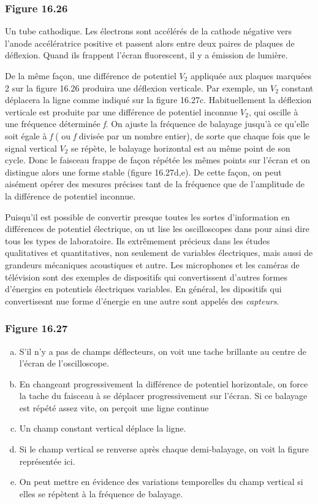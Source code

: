 \documentclass[../main.tex]{subfiles}
\begin{document}
\subsubsection*{Figure 16.26}
Un tube cathodique. Les électrons sont accélérés de la cathode négative vers l'anode accélératrice positive et passent alors entre deux paires de plaques de déflexion. Quand ils frappent l'écran fluorescent, il y a émission de lumière.\\
\par De la même façon, une différence de potentiel $V_2$ appliquée aux plaques marquées 2 sur la figure 16.26 produira une déflexion verticale. Par exemple, un $V_2$ constant déplacera la ligne comme indiqué sur la figure 16.27c. Habituellement la déflexion verticale est produite par une différence de potentiel inconnue $V_2$, qui oscille à une fréquence déterminée \textit{f}. On ajuste la fréquence de balayage jusqu'à ce qu'elle soit égale à \textit{f} ( ou \textit{f} divisée par un nombre entier), de sorte que chaque fois que le signal vertical $V_2$ se répète, le balayage horizontal est au même point de son cycle. Donc le faisceau frappe de façon répétée les mêmes points sur l'écran et on distingue alors une forme stable (figure 16.27d,e). De cette façon, on peut aisément opérer des mesures précises tant de la fréquence que de l'amplitude de la différence de potentiel inconnue.\\
\par Puisqu'il est possible de convertir presque toutes les sortes d'information en différences de potentiel électrique, on ut lise les oscilloscopes dans pour ainsi dire tous les types de laboratoire. Ils extrêmement précieux dans les études qualitatives et quantitatives, non seulement de variables électriques, mais aussi de grandeurs mécaniques acoustiques et autre. Les microphones et les caméras de télévision sont des exemples de dispositifs qui convertissent d'autres formes d'énergies en potentiels électriques variables. En général, les dipositifs qui convertisesnt nue forme d'énergie en une autre sont appelés des \textit{capteurs}.\\
\subsubsection{Figure 16.27}
\begin{enumerate}[(a)]
    \item S'il n'y a pas de champs déflecteurs, on voit une tache brillante au centre de l'écran de l'oscilloscope.
    \item En changeant progressivement la différence de potentiel horizontale, on force la tache du faisceau à se déplacer progressivement sur l'écran. Si ce balayage est répété assez vite, on perçoit une ligne continue
    \item Un champ constant vertical déplace la ligne.
    \item Si le champ vertical se renverse après chaque demi-balayage, on voit la figure représentée ici.
    \item On peut mettre en évidence des variations temporelles du champ vertical si elles se répètent à la fréquence de balayage.
\end{enumerate}
\end{document}
